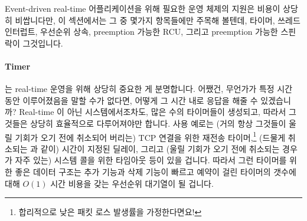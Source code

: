 Event-driven real-time 어플리케이션을 위해 필요한 운영 체제의 지원은 비용이
상당히 비쌉니다만, 이 섹션에서는 그 중 몇가지 항목들에만 주목해 볼텐데, 타이머,
쓰레드 인터럽트, 우선순위 상속, preemption 가능한 RCU, 그리고 preemption 가능한
스핀락이 그것입니다.

\paragraph{Timer} 는 real-time 운영을 위해 상당히 중요한 게 분명합니다.
어쨌건, 무언가가 특정 시간 동안 이루어졌음을 말할 수가 없다면, 어떻게 그 시간
내로 응답을 해줄 수 있겠습니까?
Real-time 이 아닌 시스템에서조차도, 많은 수의 타이머들이 생성되고, 따라서
그것들은 상당히 효율적으로 다루어져야만 합니다.
사용 예로는 (거의 항상 그것들이 울릴 기회가 오기 전에 취소되어 버리는) TCP
연결을 위한 재전송 타이머,\footnote{
	합리적으로 낮은 패킷 로스 발생률을 가정한다면요!}
(드물게 취소되는  과 같이) 시간이 지정된 딜레이, 그리고 (울릴
기회가 오기 전에 취소되는 경우가 자주 있는)  시스템 콜을 위한
타임아웃 등이 있을 겁니다.
따라서 그런 타이머를 위한 좋은 데이터 구조는 추가 기능과 삭제 기능이 빠르고
예약이 걸린 타이머의 갯수에 대해 $O(1)$ 시간 비용을 갖는 우선순위 대기열이
될 겁니다.

